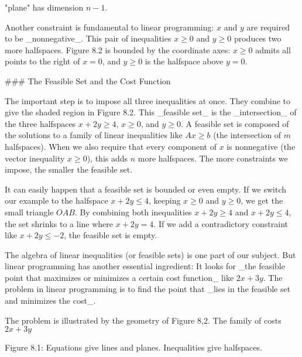 "plane" has dimension \(n-1\).

Another constraint is fundamental to linear programming: \(x\) and \(y\) are required to be _nonnegative_. This pair of inequalities \(x\geq 0\) and \(y\geq 0\) produces two more halfspaces. Figure 8.2 is bounded by the coordinate axes: \(x\geq 0\) admits all points to the right of \(x=0\), and \(y\geq 0\) is the halfspace above \(y=0\).

### The Feasible Set and the Cost Function

The important step is to impose all three inequalities at once. They combine to give the shaded region in Figure 8.2. This _feasible set_ is the _intersection_ of the three halfspaces \(x+2y\geq 4\), \(x\geq 0\), and \(y\geq 0\). A feasible set is composed of the solutions to a family of linear inequalities like \(Ax\geq b\) (the intersection of \(m\) halfspaces). When we also require that every component of \(x\) is nonnegative (the vector inequality \(x\geq 0\)), this adds \(n\) more halfspaces. The more constraints we impose, the smaller the feasible set.

It can easily happen that a feasible set is bounded or even empty. If we switch our example to the halfspace \(x+2y\leq 4\), keeping \(x\geq 0\) and \(y\geq 0\), we get the small triangle \(OAB\). By combining both inequalities \(x+2y\geq 4\) and \(x+2y\leq 4\), the set shrinks to a line where \(x+2y=4\). If we add a contradictory constraint like \(x+2y\leq-2\), the feasible set is empty.

The algebra of linear inequalities (or feasible sets) is one part of our subject. But linear programming has another essential ingredient: It looks for _the feasible point that maximizes or minimizes a certain cost function_ like \(2x+3y\). The problem in linear programming is to find the point that _lies in the feasible set and minimizes the cost_.

The problem is illustrated by the geometry of Figure 8,2. The family of costs \(2x+3y\)

Figure 8.1: Equations give lines and planes. Inequalities give halfspaces.

 